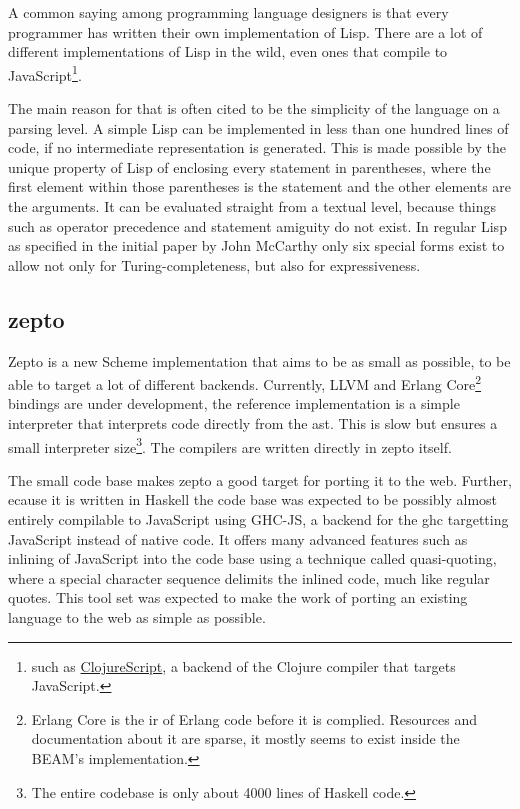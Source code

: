 \documentclass[oneside,11pt,xetex]{scrbook}
\begin{document}
A common saying among programming language designers is that every programmer has written
their own implementation of Lisp. There are a lot of different implementations of Lisp
in the wild, even ones that compile to JavaScript\footnote{such as \href{https://github.com/clojure/clojurescript}{ClojureScript},
a backend of the Clojure compiler that targets JavaScript.}.

The main reason for that is often cited to be the simplicity of the language on a parsing
level. A simple Lisp can be implemented in less than one hundred lines of code, if no
intermediate representation is generated. This is made possible by the unique property
of Lisp of enclosing every statement in parentheses, where the first element within
those parentheses is the statement and the other elements are the arguments.
It can be evaluated straight from a textual level, because things such as operator precedence
and statement amiguity do not exist. In regular Lisp as specified in the initial paper by
John McCarthy\parencite{JCM} only six special forms exist to allow not only for Turing-completeness,
but also for expressiveness.

\subsection{zepto}

Zepto is a new Scheme implementation that aims to be as small as possible, to be able
to target a lot of different backends. Currently, LLVM and Erlang Core\footnote{Erlang Core 
is the \gls{ir} of Erlang code before it is complied. Resources and documentation
about it are sparse, it mostly seems to exist inside the BEAM's implementation.} bindings are
under development, the reference implementation is a simple interpreter that interprets code
directly from the \gls{ast}. This is slow but ensures a small interpreter size\footnote{The
entire codebase is only about 4000 lines of Haskell code.}. The compilers are written directly
in zepto itself.

The small code base makes zepto a good target for porting it to the web. Further, ecause it
is written in Haskell the code base was expected to be possibly almost entirely compilable
to JavaScript using GHC-JS, a backend for the \gls{ghc} targetting JavaScript instead of
native code. It offers many advanced features such as inlining of JavaScript into the code
base using a technique called quasi-quoting, where a special character sequence delimits the
inlined code, much like regular quotes. This tool set was expected to make the work of porting
an existing language to the web as simple as possible.
\end{document}
